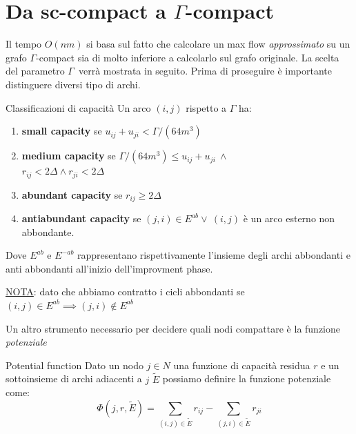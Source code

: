 \documentclass[a4paper, 11pt]{report}
\newcommand{\gmm}{$\Gamma$}
\begin{document}
\section{Da sc-compact a $\Gamma$-compact}
Il tempo $O(nm)$ si basa sul fatto che calcolare un max flow \textit{approssimato} su un grafo $\Gamma$-compact sia di molto inferiore a calcolarlo sul grafo originale.
La scelta del parametro \gmm\ verrà mostrata in seguito.
Prima di proseguire è importante distinguere diversi tipo di archi.
\begin{definition}{Classificazioni di capacità}{}
    Un arco $(i,j)$ rispetto a $\Gamma$ ha:
    \begin{enumerate}
        \item \textbf{small capacity} se $u_{ij}+u_{ji} < \Gamma/(64m^3)$
        \item \label{media}\textbf{medium capacity} se $\Gamma/(64m^3) \le u_{ij}+u_{ji}\ \land$\\ $r_{ij} < 2\Delta \land r_{ji} < 2\Delta $
        \item \textbf{abundant capacity} se $r_{ij} \ge 2\Delta$ 
        \item \textbf{antiabundant capacity} se $(j,i) \in E^{ab} \lor\ (i,j)$ è un arco esterno non abbondante.
    \end{enumerate}
    Dove $E^{ab}$ e $E^{-ab}$ rappresentano rispettivamente l'insieme degli archi abbondanti e anti abbondanti all'inizio dell'improvment phase.

    \underline{NOTA}: dato che abbiamo contratto i cicli abbondanti se $(i,j)\in E^{ab}\implies (j,i)\not \in E^{ab}$
    
\end{definition}

Un altro strumento necessario per decidere quali nodi compattare è la funzione \textit{potenziale}
\begin{definition}{Potential function}{}
    Dato un nodo $j\in N$ una funzione di capacità residua $r$ e un sottoinsieme di archi adiacenti a $j$ $\tilde{E}$  possiamo definire la funzione potenziale come: 
    \[\Phi (j, r, \tilde{E}) = \sum_{(i,j)\in \tilde{E}} r_{ij}-\sum_{(j,i)\in \tilde{E}} r_{ji}\] 
\end{definition}
\end{document}
